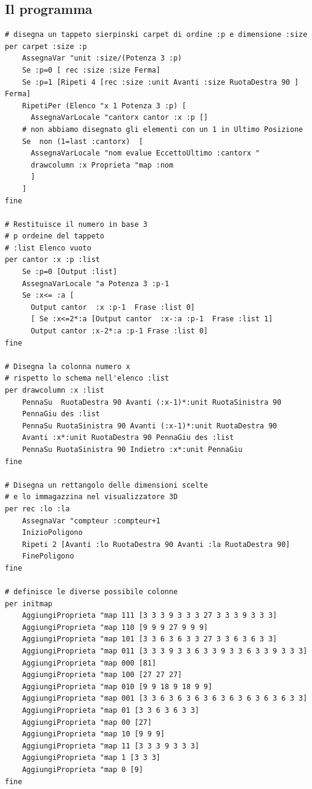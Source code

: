 \subsection{Il programma}
\begin{lstlisting}[frame=single]
# disegna un tappeto sierpinski carpet di ordine :p e dimensione :size
per carpet :size :p
	AssegnaVar "unit :size/(Potenza 3 :p)
	Se :p=0 [ rec :size :size Ferma]
	Se :p=1 [Ripeti 4 [rec :size :unit Avanti :size RuotaDestra 90 ] Ferma]
	RipetiPer (Elenco "x 1 Potenza 3 :p) [
	  AssegnaVarLocale "cantorx cantor :x :p []
	# non abbiamo disegnato gli elementi con un 1 in Ultimo Posizione
	Se  non (1=last :cantorx)  [
	  AssegnaVarLocale "nom evalue EccettoUltimo :cantorx "
	  drawcolumn :x Proprieta "map :nom
	  ]
	]  
fine

# Restituisce il numero in base 3
# p ordeine del tappeto
# :list Elenco vuoto
per cantor :x :p :list
	Se :p=0 [Output :list] 
	AssegnaVarLocale "a Potenza 3 :p-1
	Se :x<= :a [
	  Output cantor  :x :p-1  Frase :list 0] 
	  [ Se :x<=2*:a [Output cantor  :x-:a :p-1  Frase :list 1] 
	  Output cantor :x-2*:a :p-1 Frase :list 0]
fine

# Disegna la colonna numero x
# rispetto lo schema nell'elenco :list
per drawcolumn :x :list
	PennaSu  RuotaDestra 90 Avanti (:x-1)*:unit RuotaSinistra 90  
	PennaGiu des :list
	PennaSu RuotaSinistra 90 Avanti (:x-1)*:unit RuotaDestra 90 
	Avanti :x*:unit RuotaDestra 90 PennaGiu des :list
	PennaSu RuotaSinistra 90 Indietro :x*:unit PennaGiu
fine

# Disegna un rettangolo delle dimensioni scelte
# e lo immagazzina nel visualizzatore 3D
per rec :lo :la
	AssegnaVar "compteur :compteur+1
	InizioPoligono
	Ripeti 2 [Avanti :lo RuotaDestra 90 Avanti :la RuotaDestra 90]
	FinePoligono
fine

# definisce le diverse possibile colonne
per initmap
	AggiungiProprieta "map 111 [3 3 3 9 3 3 3 27 3 3 3 9 3 3 3]
	AggiungiProprieta "map 110 [9 9 9 27 9 9 9]
	AggiungiProprieta "map 101 [3 3 6 3 6 3 3 27 3 3 6 3 6 3 3]
	AggiungiProprieta "map 011 [3 3 3 9 3 3 6 3 3 9 3 3 6 3 3 9 3 3 3]
	AggiungiProprieta "map 000 [81]
	AggiungiProprieta "map 100 [27 27 27]
	AggiungiProprieta "map 010 [9 9 18 9 18 9 9]
	AggiungiProprieta "map 001 [3 3 6 3 6 3 6 3 6 3 6 3 6 3 6 3 6 3 3]
	AggiungiProprieta "map 01 [3 3 6 3 6 3 3]
	AggiungiProprieta "map 00 [27]
	AggiungiProprieta "map 10 [9 9 9]
	AggiungiProprieta "map 11 [3 3 3 9 3 3 3]
	AggiungiProprieta "map 1 [3 3 3]
	AggiungiProprieta "map 0 [9]
fine


\end{lstlisting}
